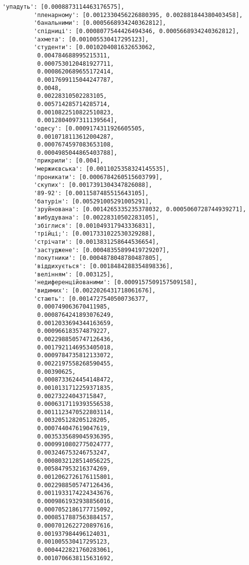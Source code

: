 \documentclass[11pt]{article}
\begin{document}
\begin{Verbatim}[commandchars=\\\{\}]
         'упадуть': [0.0008873114463176575],
         'пленарному': [0.0012330456226880395, 0.002881844380403458],
         'банальними': [0.0005668934240362812],
         'спідниці': [0.0008077544426494346, 0.0005668934240362812],
         'ахмета': [0.001005530417295123],
         'студенти': [0.0010204081632653062,
          0.004784688995215311,
          0.0007530120481927711,
          0.0008620689655172414,
          0.0017699115044247787,
          0.0048,
          0.00228310502283105,
          0.005714285714285714,
          0.0010822510822510823,
          0.0012804097311139564],
         'одесу': [0.0009174311926605505,
          0.0010718113612004287,
          0.0007674597083653108,
          0.0004985044865403788],
         'прикрили': [0.004],
         'мержиєвська': [0.0011025358324145535],
         'проникати': [0.0006784260515603799],
         'скупих': [0.0017391304347826088],
         '89-92': [0.0011587485515643105],
         'батурін': [0.005291005291005291],
         'зруйнована': [0.0014265335235378032, 0.0005060728744939271],
         'вибудувана': [0.00228310502283105],
         'збіглися': [0.001049317943336831],
         'трійці;': [0.0017331022530329288],
         'стрічати': [0.0013831258644536654],
         'застуджене': [0.00048355899419729207],
         'покутники': [0.0004878048780487805],
         'віддихується': [0.0018484288354898336],
         'велінням': [0.003125],
         'недиференційованими': [0.0009157509157509158],
         'видимих': [0.0022026431718061676],
         'стають': [0.0014727540500736377,
          0.000749063670411985,
          0.0008764241893076249,
          0.0012033694344163659,
          0.000966183574879227,
          0.0022988505747126436,
          0.0017921146953405018,
          0.0009784735812133072,
          0.0022197558268590455,
          0.00390625,
          0.0008733624454148472,
          0.0010131712259371835,
          0.00273224043715847,
          0.0006317119393556538,
          0.0011123470522803114,
          0.003205128205128205,
          0.000744047619047619,
          0.0035335689045936395,
          0.0009910802775024777,
          0.003246753246753247,
          0.0008032128514056225,
          0.005847953216374269,
          0.0012062726176115801,
          0.0022988505747126436,
          0.0011933174224343676,
          0.0009861932938856016,
          0.0007052186177715092,
          0.0008517887563884157,
          0.0007012622720897616,
          0.001937984496124031,
          0.001005530417295123,
          0.0004422821760283061,
          0.0010706638115631692,

\end{Verbatim}
\end{document}
